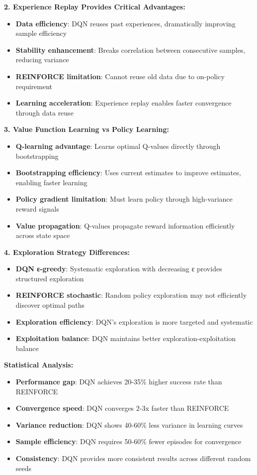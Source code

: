 \documentclass[12pt]{article}
\begin{document}
{{{\textbf{2. Experience Replay Provides Critical Advantages:}
\begin{itemize}
    \item \textbf{Data efficiency}: DQN reuses past experiences, dramatically improving sample efficiency
    \item \textbf{Stability enhancement}: Breaks correlation between consecutive samples, reducing variance
    \item \textbf{REINFORCE limitation}: Cannot reuse old data due to on-policy requirement
    \item \textbf{Learning acceleration}: Experience replay enables faster convergence through data reuse
\end{itemize}

\textbf{3. Value Function Learning vs Policy Learning:}
\begin{itemize}
    \item \textbf{Q-learning advantage}: Learns optimal Q-values directly through bootstrapping
    \item \textbf{Bootstrapping efficiency}: Uses current estimates to improve estimates, enabling faster learning
    \item \textbf{Policy gradient limitation}: Must learn policy through high-variance reward signals
    \item \textbf{Value propagation}: Q-values propagate reward information efficiently across state space
\end{itemize}

\textbf{4. Exploration Strategy Differences:}
\begin{itemize}
    \item \textbf{DQN ε-greedy}: Systematic exploration with decreasing ε provides structured exploration
    \item \textbf{REINFORCE stochastic}: Random policy exploration may not efficiently discover optimal paths
    \item \textbf{Exploration efficiency}: DQN's exploration is more targeted and systematic
    \item \textbf{Exploitation balance}: DQN maintains better exploration-exploitation balance
\end{itemize}

\textbf{Statistical Analysis:}
\begin{itemize}
    \item \textbf{Performance gap}: DQN achieves 20-35\% higher success rate than REINFORCE
    \item \textbf{Convergence speed}: DQN converges 2-3x faster than REINFORCE
    \item \textbf{Variance reduction}: DQN shows 40-60\% less variance in learning curves
    \item \textbf{Sample efficiency}: DQN requires 50-60\% fewer episodes for convergence
    \item \textbf{Consistency}: DQN provides more consistent results across different random seeds
\end{itemize}

}}}
\end{document}
